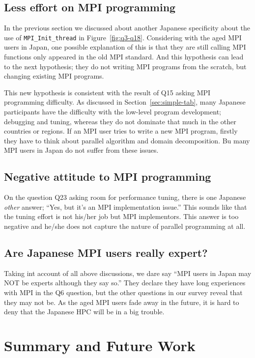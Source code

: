 \documentclass[submit,techrep,noauthor,english]{ipsj}
\begin{document}
\subsection{Less effort on MPI programming}

In the previous section we discussed about another Japanese
specificity about the use of {\tt MPI\_Init\_thread} in
Figure~\ref{fig:q3-q18}. Considering with the aged MPI users in Japan,
one possible explanation of this is that they are still calling MPI
functions only appeared in the old MPI standard. And this hypothesis
can lead to the next hypothesis; they do not writing MPI programs from
the scratch, but changing existing MPI programs.

This new hypothesis is consistent with the result of Q15 asking MPI
programming difficulty. As discussed in Section~\ref{sec:simple-tab},
many Japanese participants have the difficulty with the low-level
program development; debugging and tuning, whereas they do not
dominate that much in the other countries or regions. If an MPI user 
tries to write a new MPI program, firstly they have to think about
parallel algorithm and domain decomposition. Bu many MPI users in
Japan do not suffer from these issues.

\subsection{Negative attitude to MPI programming}

On the question Q23 asking room for performance tuning, there is one
Japanese {\it other} answer; ``Yes, but it’s an MPI implementation
issue.'' This sounds like that the tuning effort is not his/her job
but MPI implementors. This answer is too negative and he/she does not
capture the nature of parallel programming at all.

\subsection{Are Japanese MPI users really expert?}

Taking int account of all above discussions, we dare say ``MPI users
in Japan may NOT be experts although they say so.'' They declare they
have long experiences with MPI in the Q6 question, but the other
questions in our survey reveal that they may not be. As the aged MPI
users fade away in the future, it is hard to deny that the Japanese
HPC will be in a big trouble. 

\section{Summary and Future Work}
\end{document}
